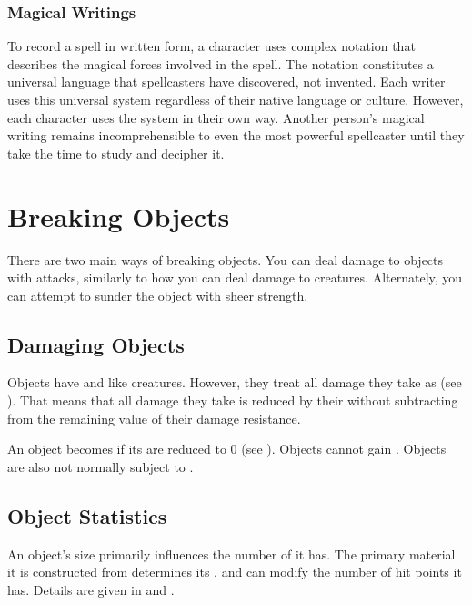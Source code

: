         \subsubsection{Magical Writings}
            To record a spell in written form, a character uses complex notation that describes the magical forces involved in the spell.
            The notation constitutes a universal language that spellcasters have discovered, not invented.
            Each writer uses this universal system regardless of their native language or culture.
            However, each character uses the system in their own way.
            Another person's magical writing remains incomprehensible to even the most powerful spellcaster until they take the time to study and decipher it.

\section{Breaking Objects}
    There are two main ways of breaking objects.
    You can deal damage to objects with attacks, similarly to how you can deal damage to creatures.
    Alternately, you can attempt to sunder the object with sheer strength.

    \subsection{Damaging Objects}
        Objects have  and  like creatures.
        However, they treat all damage they take as  (see ).
        That means that all damage they take is reduced by their  without subtracting from the remaining value of their damage resistance.

        An object becomes  if its  are reduced to 0 (see ).
        Objects cannot gain .
        Objects are also not normally subject to .

    \subsection{Object Statistics}
        An object's size primarily influences the number of  it has.
        The primary material it is constructed from determines its , and can modify the number of hit points it has.
        Details are given in  and .

